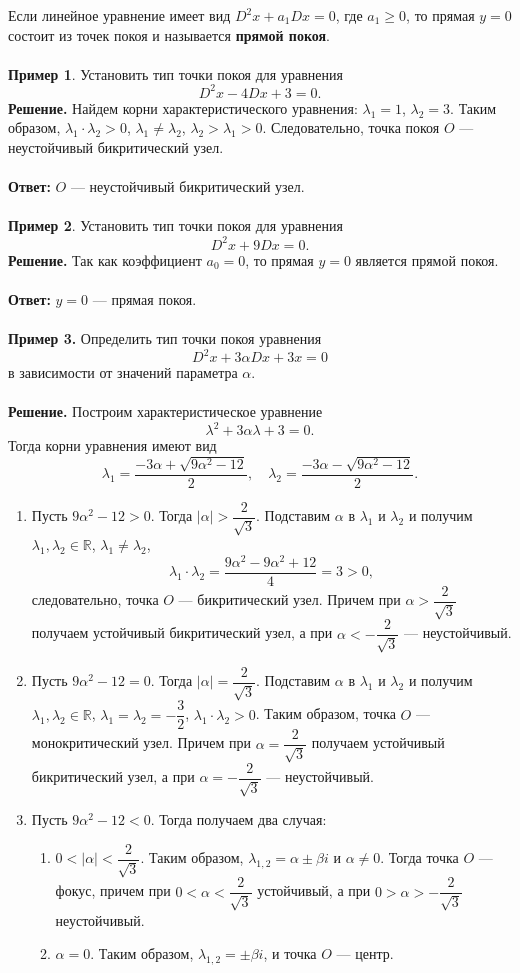 \documentclass[a4paper, 12pt]{article}
\newcommand{\Rm}{\mathbb{R}}
\begin{document}
Если линейное уравнение имеет вид $D^2x + a_1Dx = 0$, где $a_1 \geqslant 0$, то прямая $y=0$ состоит из точек покоя и называется \textbf{прямой покоя}.\\\\
\textbf{Пример 1}. Установить тип точки покоя для уравнения $$D^2x - 4Dx + 3 =0.$$
\textbf{Решение.} Найдем корни характеристического уравнения: $\lambda_1 = 1$, $\lambda_2 = 3$. Таким образом, $\lambda_1\cdot \lambda_2 > 0$, $\lambda_1 \ne \lambda_2$, $\lambda_2 > \lambda_1 > 0$. Следовательно, точка покоя $O$ --- неустойчивый бикритический узел.\\\\
\textbf{Ответ:} $O$ --- неустойчивый бикритический узел.\\\\
\textbf{Пример 2}. Установить тип точки покоя для уравнения $$D^2x + 9Dx =0.$$
\textbf{Решение.} Так как коэффициент $a_0 = 0$, то прямая $y = 0$ является прямой покоя.\\\\\textbf{Ответ:} $y = 0$ --- прямая покоя.\\\\
\textbf{Пример 3.} Определить тип точки покоя уравнения $$D^2x + 3\alpha Dx + 3x = 0$$ в зависимости от значений параметра $\alpha$.\\\\
\textbf{Решение.} Построим характеристическое уравнение $$\lambda^2 + 3\alpha\lambda + 3 = 0.$$
Тогда корни уравнения имеют вид $$\lambda_1 = \dfrac{-3\alpha + \sqrt{9\alpha^2 - 12}}{2},\quad \lambda_2 = \dfrac{-3\alpha - \sqrt{9\alpha^2 - 12}}{2}.$$\begin{enumerate}
	\item Пусть $9\alpha^2 - 12 > 0$. Тогда $|\alpha| > \dfrac{2}{\sqrt{3}}$. Подставим $\alpha$ в $\lambda_1$ и $\lambda_2$ и получим $\lambda_1, \lambda_2 \in \Rm$, $\lambda_1 \ne \lambda_2$, $$\lambda_1 \cdot \lambda_2 = \dfrac{9\alpha^2 - 9\alpha^2 + 12}{4} = 3 > 0,$$ следовательно, точка $O$ --- бикритический узел. Причем при $\alpha > \dfrac{2}{\sqrt{3}}$ получаем устойчивый бикритический узел, а при $\alpha < -\dfrac{2}{\sqrt{3}}$ --- неустойчивый.
	\item Пусть $9\alpha^2 - 12 = 0$. Тогда $|\alpha| = \dfrac{2}{\sqrt{3}}$. Подставим $\alpha$ в $\lambda_1$ и $\lambda_2$ и получим $\lambda_1, \lambda_2 \in \Rm$, $\lambda_1 = \lambda_2 = -\dfrac{3}{2}$, $\lambda_1\cdot\lambda_2 > 0$. Таким образом, точка $O$ --- монокритический узел. Причем при $\alpha = \dfrac{2}{\sqrt{3}}$ получаем устойчивый бикритический узел, а при $\alpha = -\dfrac{2}{\sqrt{3}}$ --- неустойчивый.
	\item Пусть $9\alpha^2 - 12 < 0$. Тогда получаем два случая:\begin{enumerate}
		\item $0 < |\alpha| < \dfrac{2}{\sqrt{3}}$. Таким образом, $\lambda_{1,2} = \alpha \pm \beta i$ и $\alpha \ne 0$. Тогда точка $O$ --- фокус, причем при $0 <\alpha < \dfrac{2}{\sqrt{3}}$ устойчивый, а при  $0 > \alpha >- \dfrac{2}{\sqrt{3}}$ неустойчивый.
		\item $\alpha = 0$. Таким образом, $\lambda_{1,2} = \pm \beta i$, и точка $O$ --- центр.
	\end{enumerate}
\end{enumerate}
\end{document}
